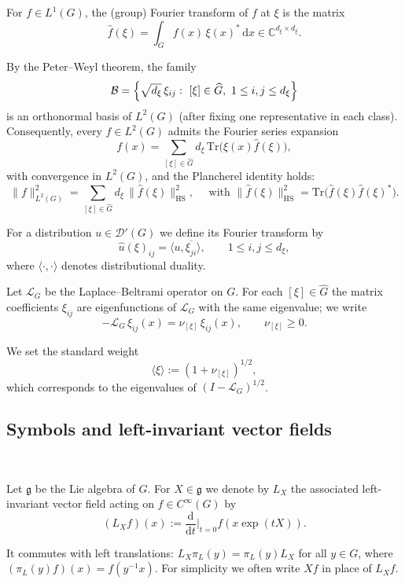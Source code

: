 \documentclass[11pt,reqno]{amsart}
\numberwithin{equation}{section}
\begin{document}
	
	For $f\in L^1(G)$, the (group) Fourier transform of $f$ at $\xi$ is the matrix
	\[
	\widehat{f}(\xi)=\int_G f(x)\,\xi(x)^*\,\mathrm{d}x\in\mathbb{C}^{d_\xi\times d_\xi}.
	\]
	
	By the Peter--Weyl theorem, the family
	\[
	\mathcal{B}=\Bigl\{\sqrt{d_\xi}\,\xi_{ij}:\ [\xi]\in\widehat{G},\ 1\le i,j\le d_\xi\Bigr\}
	\]
	is an orthonormal basis of $L^2(G)$ (after fixing one representative in each class). Consequently, every $f\in L^2(G)$ admits the Fourier series expansion
	\[
	f(x)=\sum_{[\xi]\in\widehat{G}} d_\xi\,\mathrm{Tr}\bigl(\xi(x)\widehat{f}(\xi)\bigr),
	\]
	with convergence in $L^2(G)$, and the Plancherel identity holds:
	\[
	\|f\|_{L^2(G)}^2=\sum_{[\xi]\in\widehat{G}} d_\xi\, \|\widehat{f} (\xi)\|_{\mathrm{HS}}^2, \quad \text{ with } \|\widehat{f} (\xi)\|_{\mathrm{HS}}^2=\mathrm{Tr}\bigl(\widehat{f}(\xi)\widehat{f}(\xi)^*\bigr).
	\]
	
	For a distribution $u\in\mathcal{D}'(G)$ we define its Fourier transform by
	\[
	\widehat{u}(\xi)_{ij}=\langle u,\overline{\xi_{ji}}\rangle,\qquad 1\le i,j\le d_\xi,
	\]
	where $\langle\cdot,\cdot\rangle$ denotes distributional duality.
	
	Let $\mathcal{L}_G$ be the Laplace--Beltrami operator on $G$. For each $[\xi]\in\widehat{G}$ the matrix coefficients $\xi_{ij}$ are eigenfunctions of $\mathcal{L}_G$ with the same eigenvalue; we write
	\begin{equation}\label{eq:laplacian_eigen_rewrite}
		-\mathcal{L}_G\,\xi_{ij}(x)=\nu_{[\xi]}\,\xi_{ij}(x),\qquad \nu_{[\xi]}\ge 0.
	\end{equation}
	
	We set the standard weight
	\[
	\langle \xi\rangle := (1+\nu_{[\xi]})^{1/2},
	\]
	which corresponds to the eigenvalues of $(I-\mathcal{L}_G)^{1/2}$.
	
\subsection{Symbols and left-invariant vector fields}\label{subsec:symbols_X} \
	
	Let $\mathfrak{g}$ be the Lie algebra of $G$. For $X\in\mathfrak{g}$ we denote by $L_X$ the associated left-invariant vector field acting on $f\in C^\infty(G)$ by
	\[
	(L_X f)(x):=\frac{\mathrm{d}}{\mathrm{d}t}\bigg|_{t=0} f(x\exp(tX)).
	\]
	
	It commutes with left translations: $L_X\pi_L(y)=\pi_L(y)L_X$ for all $y\in G$, where $(\pi_L(y)f)(x)=f(y^{-1}x)$.
	For simplicity we often write $Xf$ in place of $L_Xf$.
	
\end{document}

